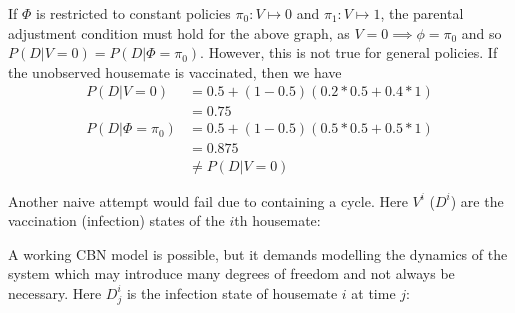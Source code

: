 If $\Phi$ is restricted to constant policies $\pi_0:V\mapsto 0$ and $\pi_1:V\mapsto 1$, the parental adjustment condition must hold for the above graph, as $V=0\implies \phi=\pi_0$ and so $P(D|V=0)=P(D|\Phi=\pi_0)$. However, this is not true for general policies. If the unobserved housemate is vaccinated, then we have
\begin{align}
    P(D|V=0) &= 0.5 + (1-0.5)(0.2*0.5+0.4*1) \\
             &= 0.75 \\
    P(D|\Phi=\pi_0) &= 0.5 + (1-0.5)(0.5*0.5 + 0.5*1) \\
            &= 0.875 \\
            &\neq P(D|V=0)
\end{align}

Another naive attempt would fail due to containing a cycle. Here $V^i$ ($D^i$) are the vaccination (infection) states of the $i$th housemate:

\begin{center}
\end{center}

A working CBN model is possible, but it demands modelling the dynamics of the system which may introduce many degrees of freedom and not always be necessary. Here $D^i_j$ is the infection state of housemate $i$ at time $j$:

\begin{center}
\end{center}

